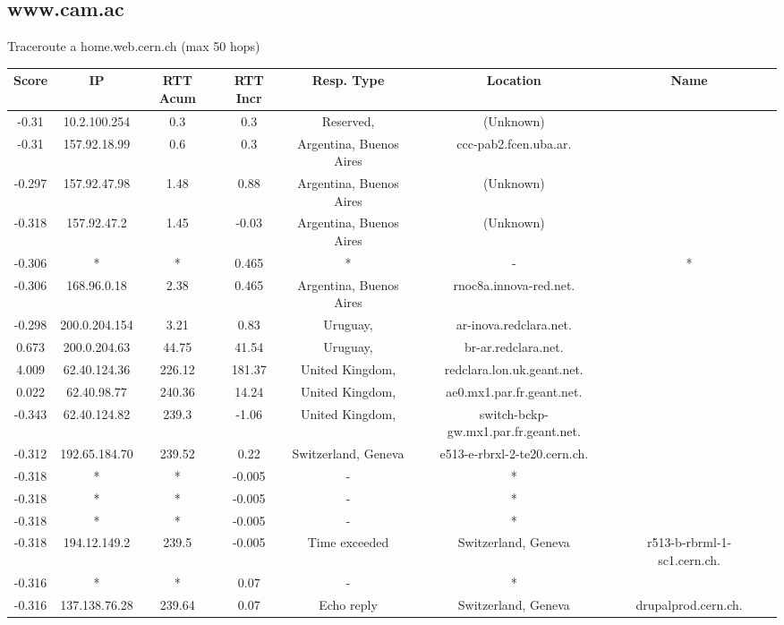 \subsection{www.cam.ac}
Traceroute a home.web.cern.ch (max 50 hops)
\begin{center}
	\begin{tabular}{ c | c | c | c | c | c | c | c }
		\hline
		Score & IP & RTT Acum & RTT Incr & Resp. Type & Location & Name\\
		\hline
		-0.31 & 10.2.100.254 & 0.3 & 0.3 & Reserved,  & (Unknown)\\
		\hline
		-0.31 & 157.92.18.99 & 0.6 & 0.3 & Argentina, Buenos Aires & ccc-pab2.fcen.uba.ar.\\
		\hline
		-0.297 & 157.92.47.98 & 1.48 & 0.88 & Argentina, Buenos Aires & (Unknown)\\
		\hline
		-0.318 & 157.92.47.2 & 1.45 & -0.03 & Argentina, Buenos Aires & (Unknown)\\
		\hline
		-0.306 & * & * & 0.465 & * & - & *\\
		\hline
		-0.306 & 168.96.0.18 & 2.38 & 0.465 & Argentina, Buenos Aires & rnoc8a.innova-red.net.\\
		\hline
		-0.298 & 200.0.204.154 & 3.21 & 0.83 & Uruguay,  & ar-inova.redclara.net.\\
		\hline
		0.673 & 200.0.204.63 & 44.75 & 41.54 & Uruguay,  & br-ar.redclara.net.\\
		\hline
		4.009 & 62.40.124.36 & 226.12 & 181.37 & United Kingdom,  & redclara.lon.uk.geant.net.\\
		\hline
		0.022 & 62.40.98.77 & 240.36 & 14.24 & United Kingdom,  & ae0.mx1.par.fr.geant.net.\\
		\hline
		-0.343 & 62.40.124.82 & 239.3 & -1.06 & United Kingdom,  & switch-bckp-gw.mx1.par.fr.geant.net.\\
		\hline
		-0.312 & 192.65.184.70 & 239.52 & 0.22 & Switzerland, Geneva & e513-e-rbrxl-2-te20.cern.ch.\\
		\hline
		-0.318 & * & * & -0.005 & - & *\\
		\hline
		-0.318 & * & * & -0.005 & - & *\\
		\hline
		-0.318 & * & * & -0.005 & - & *\\
		\hline
		-0.318 & 194.12.149.2 & 239.5 & -0.005 & Time exceeded & Switzerland, Geneva & r513-b-rbrml-1-sc1.cern.ch.\\
		\hline
		-0.316 & * & * & 0.07 & - & *\\
		\hline
		-0.316 & 137.138.76.28 & 239.64 & 0.07 & Echo reply & Switzerland, Geneva & drupalprod.cern.ch.\\
	\end{tabular}
\end{center}

